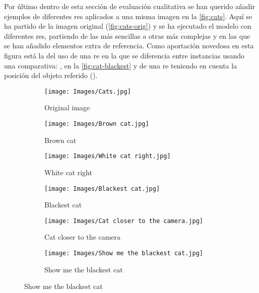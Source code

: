 Por último dentro de esta sección de evaluación cualitativa se han querido
añadir ejemplos de diferentes \glspl{re} aplicados a una misma imagen en la
\vref{fig:cats}. Aquí se ha partido de la imagen original
(\vref{fig:cats-orig}) y se ha ejecutado el modelo con diferentes \glspl{re},
partiendo de las más sencillas a otras más complejas y en las que se han
añadido elementos extra de referencia. Como aportación novedosa en esta figura
está la del uso de una \gls{re} en la que se diferencia entre instancias usando
una comparativa: , en la \vref{fig:cat-blackest} y de una
\gls{re} teniendo en cuenta la posición del objeto referido ().

\begin{figure}[p]
  \centering
  \begin{subfigure}[t]{.3\textwidth}
    \centering
    \caption{Original image}\label{fig:cats-orig}
    \texttt{[image: Images/Cats.jpg]}
  \end{subfigure}\hfill
  \begin{subfigure}[t]{.3\textwidth}
    \centering
    \caption{Brown cat}
    \texttt{[image: Images/Brown cat.jpg]}
  \end{subfigure}\hfill
  \begin{subfigure}[t]{.3\textwidth}
    \centering
    \caption{White cat right}
    \texttt{[image: Images/White cat right.jpg]}
  \end{subfigure}

  \bigskip
  \begin{subfigure}[t]{.3\textwidth}
    \centering
    \caption{Blackest cat}\label{fig:cat-blackest}
    \texttt{[image: Images/Blackest cat.jpg]}
  \end{subfigure}\hfill
  \begin{subfigure}[t]{.3\textwidth}
    \centering
    \caption{Cat closer to the camera}
    \texttt{[image: Images/Cat closer to the camera.jpg]}
  \end{subfigure}\hfill
  \begin{subfigure}[t]{.3\textwidth}
    \centering
    \caption{Show me the blackest cat}
    \texttt{[image: Images/Show me the blackest cat.jpg]}
  \end{subfigure}


\end{figure}
